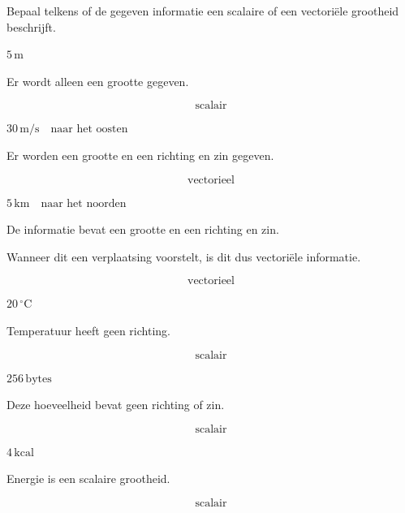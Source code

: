 \documentclass{ximera}
\begin{document}
\begin{oefening}{\oefB\ESS}

Bepaal telkens of de gegeven informatie een scalaire of een vectoriële
grootheid beschrijft.

\begin{question}
\(
5\,\si{\meter}
\)

\begin{oplossing}
Er wordt alleen een grootte gegeven.

\[
\boxed{\text{scalair}}
\]
\end{oplossing}
\end{question}


\begin{question}
\(
30\,\si{\meter\per\second}
\quad \text{naar het oosten}
\)

\begin{oplossing}
Er worden een grootte en een richting en zin gegeven.

\[
\boxed{\text{vectorieel}}
\]
\end{oplossing}
\end{question}


\begin{question}
\(
5\,\si{\kilo\meter}
\quad \text{naar het noorden}
\)

\begin{oplossing}
De informatie bevat een grootte en een richting en zin.

Wanneer dit een verplaatsing voorstelt, is dit dus vectoriële informatie.

\[
\boxed{\text{vectorieel}}
\]
\end{oplossing}
\end{question}


\begin{question}
\(
20\,^{\circ}\mathrm{C}
\)

\begin{oplossing}
Temperatuur heeft geen richting.

\[
\boxed{\text{scalair}}
\]
\end{oplossing}
\end{question}


\begin{question}
\(
256\,\mathrm{bytes}
\)

\begin{oplossing}
Deze hoeveelheid bevat geen richting of zin.

\[
\boxed{\text{scalair}}
\]
\end{oplossing}
\end{question}


\begin{question}
\(
4\,\mathrm{kcal}
\)

\begin{oplossing}
Energie is een scalaire grootheid.

\[
\boxed{\text{scalair}}
\]
\end{oplossing}
\end{question}

\end{oefening}
\end{document}
